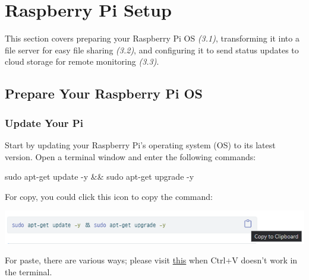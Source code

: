 \documentclass[
  letterpaper,
]{scrbook}
\newenvironment{Shaded}{\begin{snugshade}}{\end{snugshade}}
\newcommand{\AttributeTok}[1]{\textcolor[rgb]{0.40,0.45,0.13}{#1}}
\newcommand{\FunctionTok}[1]{\textcolor[rgb]{0.28,0.35,0.67}{#1}}
\newcommand{\KeywordTok}[1]{\textcolor[rgb]{0.00,0.23,0.31}{#1}}
\newcommand{\NormalTok}[1]{\textcolor[rgb]{0.00,0.23,0.31}{#1}}
\begin{document}
\hypertarget{raspberry-pi-setup}{%
\chapter{Raspberry Pi Setup}\label{raspberry-pi-setup}}

This section covers preparing your Raspberry Pi OS \emph{(3.1)},
transforming it into a file server for easy file sharing \emph{(3.2)},
and configuring it to send status updates to cloud storage for remote
monitoring \emph{(3.3)}.

\hypertarget{prepare-your-raspberry-pi-os}{%
\section{Prepare Your Raspberry Pi
OS}\label{prepare-your-raspberry-pi-os}}

\hypertarget{update-your-pi}{%
\subsection{Update Your Pi}\label{update-your-pi}}

Start by updating your Raspberry Pi's operating system (OS) to its
latest version. Open a terminal window and enter the following commands:

\begin{Shaded}
\begin{Highlighting}[]
\FunctionTok{sudo}\NormalTok{ apt{-}get update }\AttributeTok{{-}y} \KeywordTok{\&\&} \FunctionTok{sudo}\NormalTok{ apt{-}get upgrade }\AttributeTok{{-}y}
\end{Highlighting}
\end{Shaded}

\begin{tcolorbox}[enhanced jigsaw, bottomrule=.15mm, opacitybacktitle=0.6, toprule=.15mm, colback=white, colbacktitle=quarto-callout-note-color!10!white, left=2mm, colframe=quarto-callout-note-color-frame, coltitle=black, title=\textcolor{quarto-callout-note-color}{\faInfo}\hspace{0.5em}{How to copy/paste in Linux terminal}, opacityback=0, breakable, bottomtitle=1mm, toptitle=1mm, titlerule=0mm, arc=.35mm, leftrule=.75mm, rightrule=.15mm]

For copy, you could click this icon to copy the command:

\includegraphics{content/material/ch2/ex_copy.png}

For paste, there are various ways; please visit
\href{https://www.maketecheasier.com/enable-copy-paste-command-prompt-windows10/}{this}
when Ctrl+V doesn't work in the terminal.

\end{tcolorbox}
\end{document}
